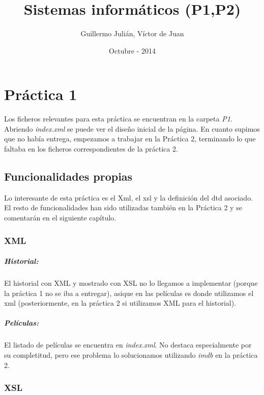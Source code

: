 \documentclass{apuntes}
\title{Sistemas informáticos (P1,P2)}
\author{Guillermo Julián, Víctor de Juan}
\date{Octubre - 2014}
\begin{document}
\pagestyle{plain}
\maketitle

\tableofcontents
\newpage

\chapter{Práctica 1}

Los ficheros relevantes para esta práctica se encuentran en la carpeta \textit{P1}. Abriendo \textit{index.xml} se puede ver el diseño inicial de la página. En cuanto supimos que no había entrega, empezamos a trabajar en la Práctica 2, terminando lo que faltaba en los ficheros correspondientes de la práctica 2.

\section{Funcionalidades propias}
Lo interesante de esta práctica es el Xml, el xsl y la definición del dtd asociado. El resto de funcionalidades han sido utilizadas también en la Práctica 2 y se comentarán en el siguiente capítulo.


\subsection{XML}

\paragraph{Historial: }
El historial con XML y mostrado con XSL no lo llegamos a implementar (porque la práctica 1 no se iba a entregar), asique en las películas es donde utilizamos el xml (posteriormente, en la práctica 2 si utilizamos XML para el historial).

\paragraph{Películas: }
El listado de películas se encuentra en \textit{index.xml}. No destaca especialmente por su completitud, pero ese problema lo solucionamos utilizando \textit{imdb} en la práctica 2. 

\subsection{XSL} 
\end{document}

